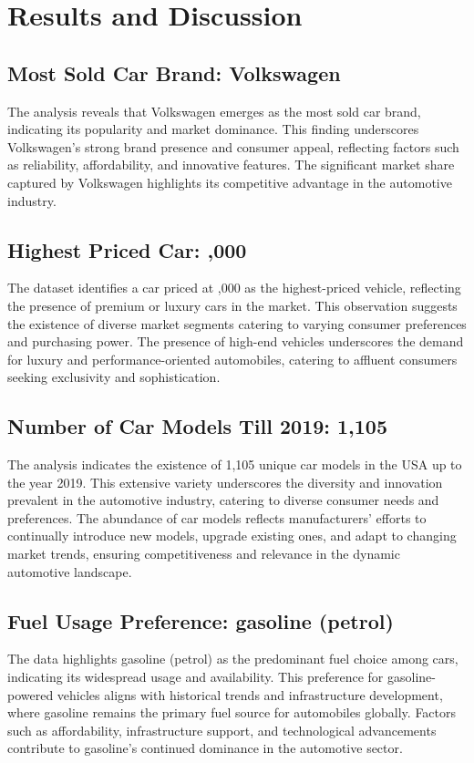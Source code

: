 \documentclass{article}
\begin{document}
\section{Results and Discussion}
\vspace{1cm}
{\fontsize{15}{15}\selectfont


\subsection*{Most Sold Car Brand: Volkswagen}
The analysis reveals that Volkswagen emerges as the most sold car brand, indicating its popularity and market dominance. This finding underscores Volkswagen's strong brand presence and consumer appeal, reflecting factors such as reliability, affordability, and innovative features. The significant market share captured by Volkswagen highlights its competitive advantage in the automotive industry.

\subsection*{Highest Priced Car: ,000}
The dataset identifies a car priced at ,000 as the highest-priced vehicle, reflecting the presence of premium or luxury cars in the market. This observation suggests the existence of diverse market segments catering to varying consumer preferences and purchasing power. The presence of high-end vehicles underscores the demand for luxury and performance-oriented automobiles, catering to affluent consumers seeking exclusivity and sophistication.

\subsection*{Number of Car Models Till 2019: 1,105}
The analysis indicates the existence of 1,105 unique car models in the USA up to the year 2019. This extensive variety underscores the diversity and innovation prevalent in the automotive industry, catering to diverse consumer needs and preferences. The abundance of car models reflects manufacturers' efforts to continually introduce new models, upgrade existing ones, and adapt to changing market trends, ensuring competitiveness and relevance in the dynamic automotive landscape.

\subsection*{Fuel Usage Preference: gasoline (petrol)}
The data highlights gasoline (petrol) as the predominant fuel choice among cars, indicating its widespread usage and availability. This preference for gasoline-powered vehicles aligns with historical trends and infrastructure development, where gasoline remains the primary fuel source for automobiles globally. Factors such as affordability, infrastructure support, and technological advancements contribute to gasoline's continued dominance in the automotive sector.
\newpage
}
\end{document}
